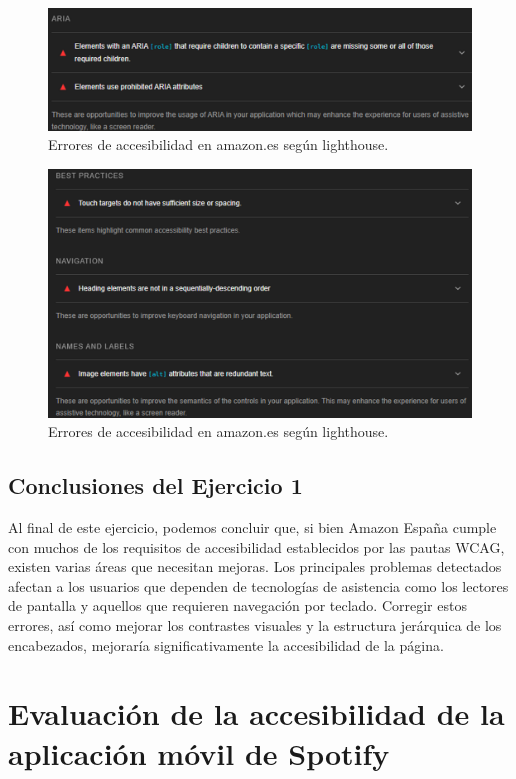 \documentclass[letterpaper, 12pt]{report}
\begin{document}
\begin{figure}[H]
\centering
\includegraphics[width=1\textwidth]{figure24.png}
\caption{Errores de accesibilidad en amazon.es según lighthouse.}
\label{fig:24}
\end{figure}

\begin{figure}[H]
\centering
\includegraphics[width=1\textwidth]{figure25.png}
\caption{Errores de accesibilidad en amazon.es según lighthouse.}
\label{fig:25}
\end{figure}

\subsection{Conclusiones del Ejercicio 1}

Al final de este ejercicio, podemos concluir que, si bien Amazon España cumple con muchos de los requisitos de accesibilidad establecidos por las pautas WCAG, existen varias áreas que necesitan mejoras. Los principales problemas detectados afectan a los usuarios que dependen de tecnologías de asistencia como los lectores de pantalla y aquellos que requieren navegación por teclado. Corregir estos errores, así como mejorar los contrastes visuales y la estructura jerárquica de los encabezados, mejoraría significativamente la accesibilidad de la página.

\section{Evaluación de la accesibilidad de la aplicación móvil de Spotify}
\end{document}
